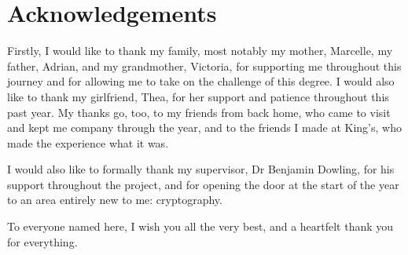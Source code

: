 \section*{Acknowledgements}
\label{ack:acknowledgements}

Firstly, I would like to thank my family, most notably my mother, Marcelle, my father, Adrian, and my grandmother, Victoria, for supporting me throughout this journey and for allowing me to take on the challenge of this degree. I would also like to thank my girlfriend, Thea, for her support and patience throughout this past year. My thanks go, too, to my friends from back home, who came to visit and kept me company through the year, and to the friends I made at King's, who made the experience what it was.

I would also like to formally thank my supervisor, Dr Benjamin Dowling, for his support throughout the project, and for opening the door at the start of the year to an area entirely new to me: cryptography.

To everyone named here, I wish you all the very best, and a heartfelt thank you for everything.
